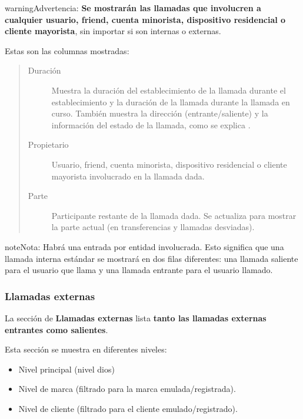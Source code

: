 \documentclass[letterpaper,10pt,spanish]{sphinxmanual}
\begin{document}
\begin{notice}{warning}{Advertencia:}
\textbf{Se mostrarán las llamadas que involucren a cualquier usuario, friend, cuenta minorista, dispositivo residencial o cliente mayorista}, sin importar si son internas o externas.
\end{notice}

Estas son las columnas mostradas:
\begin{quote}
\begin{description}
\item[{Duración}] \leavevmode
Muestra la duración del establecimiento de la llamada durante el establecimiento y la duración de la llamada durante la llamada en curso. También muestra la dirección (entrante/saliente) y la información del estado de la llamada, como se explica {\hyperref[administration_portal/platform/active_calls:call\string-state]{}}.

\item[{Propietario}] \leavevmode
Usuario, friend, cuenta minorista, dispositivo residencial o cliente mayorista involucrado en la llamada dada.

\item[{Parte}] \leavevmode
Participante restante de la llamada dada. Se actualiza para mostrar la parte actual (en transferencias y llamadas desviadas).

\end{description}
\end{quote}

\begin{notice}{note}{Nota:}
Habrá una entrada por entidad involucrada. Esto significa que una llamada interna estándar se mostrará en dos filas diferentes: una llamada saliente para el usuario que llama y una llamada entrante para el usuario llamado.
\end{notice}


\subsubsection{Llamadas externas}
\label{administration_portal/client/vpbx/calls/external_calls::doc}\label{administration_portal/client/vpbx/calls/external_calls:external-calls}
La sección de \textbf{Llamadas externas} lista \textbf{tanto las llamadas externas entrantes como salientes}.

Esta sección se muestra en diferentes niveles:
\begin{itemize}
\item {} 
Nivel principal (nivel dios)

\item {} 
Nivel de marca (filtrado para la marca emulada/registrada).

\item {} 
Nivel de cliente (filtrado para el cliente emulado/registrado).

\end{itemize}
\end{document}
